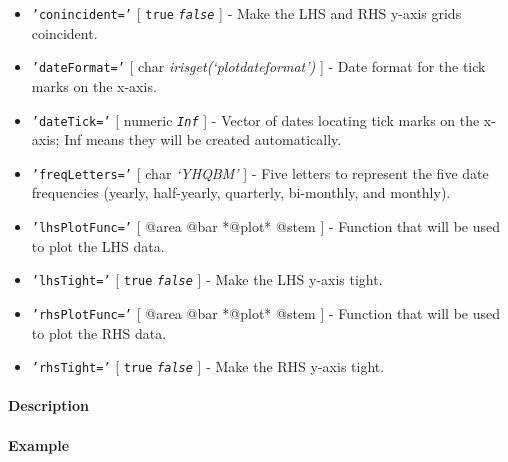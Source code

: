 \begin{itemize}
\item
  \texttt{'conincident='} {[} \texttt{true} \textbar{}
  \emph{\texttt{false}} {]} - Make the LHS and RHS y-axis grids
  coincident.
\item
  \texttt{'dateFormat='} {[} char \textbar{}
  \emph{irisget(`plotdateformat')} {]} - Date format for the tick marks
  on the x-axis.
\item
  \texttt{'dateTick='} {[} numeric \textbar{} \emph{\texttt{Inf}} {]} -
  Vector of dates locating tick marks on the x-axis; Inf means they will
  be created automatically.
\item
  \texttt{'freqLetters='} {[} char \textbar{} \emph{`YHQBM'} {]} - Five
  letters to represent the five date frequencies (yearly, half-yearly,
  quarterly, bi-monthly, and monthly).
\item
  \texttt{'lhsPlotFunc='} {[} @area \textbar{} @bar \textbar{} *@plot*
  \textbar{} @stem {]} - Function that will be used to plot the LHS
  data.
\item
  \texttt{'lhsTight='} {[} \texttt{true} \textbar{}
  \emph{\texttt{false}} {]} - Make the LHS y-axis tight.
\item
  \texttt{'rhsPlotFunc='} {[} @area \textbar{} @bar \textbar{} *@plot*
  \textbar{} @stem {]} - Function that will be used to plot the RHS
  data.
\item
  \texttt{'rhsTight='} {[} \texttt{true} \textbar{}
  \emph{\texttt{false}} {]} - Make the RHS y-axis tight.
\end{itemize}

\paragraph{Description}

\paragraph{Example}


